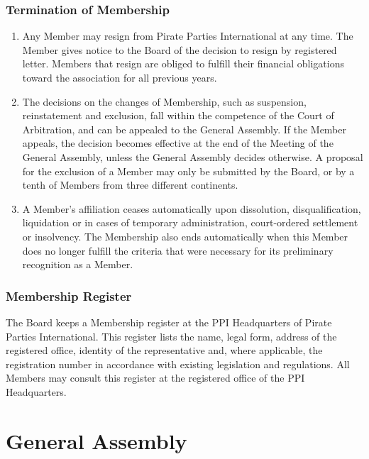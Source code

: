 \begin{frame}

\frametitle{Termination of Membership}
\label{terminationofmembership}

\begin{enumerate}
\item Any Member may resign from Pirate Parties International at any time. The Member gives notice to the Board of the decision to resign by registered letter. Members that resign are obliged to fulfill their financial obligations toward the association for all previous years.

\item The decisions on the changes of Membership, such as suspension, reinstatement and exclusion, fall within the competence of the Court of Arbitration, and can be appealed to the General Assembly. If the Member appeals, the decision becomes effective at the end of the Meeting of the General Assembly, unless the General Assembly decides otherwise. A proposal for the exclusion of a Member may only be submitted by the Board, or by a tenth of Members from three different continents.

\item A Member’s affiliation ceases automatically upon dissolution, disqualification, liquidation or in cases of temporary administration, court-{}ordered settlement or insolvency. The Membership also ends automatically when this Member does no longer fulfill the criteria that were necessary for its preliminary recognition as a Member.

\end{enumerate}

\end{frame}

\begin{frame}

\frametitle{Membership Register}
\label{membershipregister}

The Board keeps a Membership register at the PPI Headquarters of Pirate Parties International. This register lists the name, legal form, address of the registered office, identity of the representative and, where applicable, the registration number in accordance with existing legislation and regulations. All Members may consult this register at the registered office of the PPI Headquarters.

\end{frame}

\section{General Assembly}
\label{generalassembly}

